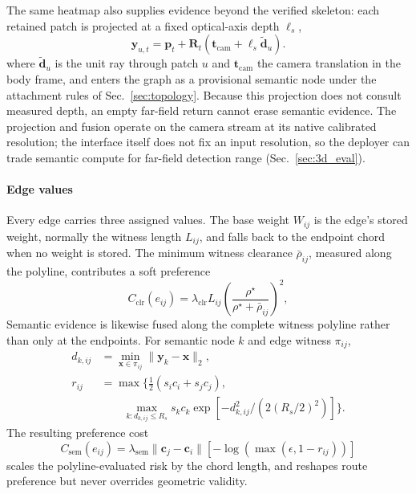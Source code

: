 \documentclass[letterpaper,10pt,conference]{ieeeconf}
\newcommand{\vect}[1]{\boldsymbol{#1}}
\newcommand{\mat}[1]{\mathbf{#1}}
\begin{document}
The same heatmap also supplies evidence beyond the verified skeleton:
each retained patch is projected at a fixed optical-axis depth $\ell_s$,
\begin{equation}
 \vect{y}_{u,t}=\vect{p}_t+\mat{R}_t
 \left(\vect{t}_{\mathrm{cam}}+\ell_s\widetilde{\vect{d}}_u\right).
\label{eq:projection}
\end{equation}
where $\widetilde{\vect{d}}_u$ is the unit ray through patch $u$ and
$\vect{t}_{\mathrm{cam}}$ the camera translation in the body frame,
and enters the graph as a provisional semantic node under the attachment
rules of Sec.~\ref{sec:topology}.  Because this projection does not
consult measured depth, an empty far-field return cannot erase semantic
evidence.
The projection and fusion operate on the camera stream at its native
calibrated resolution; the interface itself does not fix an input
resolution, so the deployer can trade semantic compute for far-field
detection range (Sec.~\ref{sec:3d_eval}).

\paragraph{Edge values}
Every edge carries three assigned values.  The base weight $W_{ij}$ is
the edge's stored weight, normally the witness length $L_{ij}$, and
falls back to the endpoint chord when no weight is stored.  The minimum
witness clearance $\bar\rho_{ij}$, measured along the polyline,
contributes a soft preference
\begin{equation}
 C_{\mathrm{clr}}(e_{ij})=
 \lambda_{\mathrm{clr}}L_{ij}
 \left(\frac{\rho^\star}{\rho^\star+\bar\rho_{ij}}\right)^2,
\label{eq:clearance}
\end{equation}
Semantic evidence is likewise fused along the complete witness polyline
rather than only at the endpoints.  For semantic node $k$ and edge
witness $\pi_{ij}$,
\begin{equation}
\begin{aligned}
 d_{k,ij}&=\min_{\vect{x}\in\pi_{ij}}
             \|\vect{y}_k-\vect{x}\|_2,\\
 r_{ij}&=\max\Big\{\tfrac12(s_i c_i+s_jc_j),\\[-2pt]
 &\qquad \max_{k:d_{k,ij}\le R_s}s_kc_k
 \exp[-d_{k,ij}^2/(2(R_s/2)^2)]\Big\}.
\end{aligned}
\label{eq:semantic_fusion}
\end{equation}
The resulting preference cost
\begin{equation}
 C_{\mathrm{sem}}(e_{ij})=
 \lambda_{\mathrm{sem}}\|\vect{c}_j-\vect{c}_i\|
 [-\log(\max(\epsilon,1-r_{ij}))]
\label{eq:semantic_cost}
\end{equation}
scales the polyline-evaluated risk by the chord length, and
reshapes route preference but never overrides geometric validity.
\end{document}
